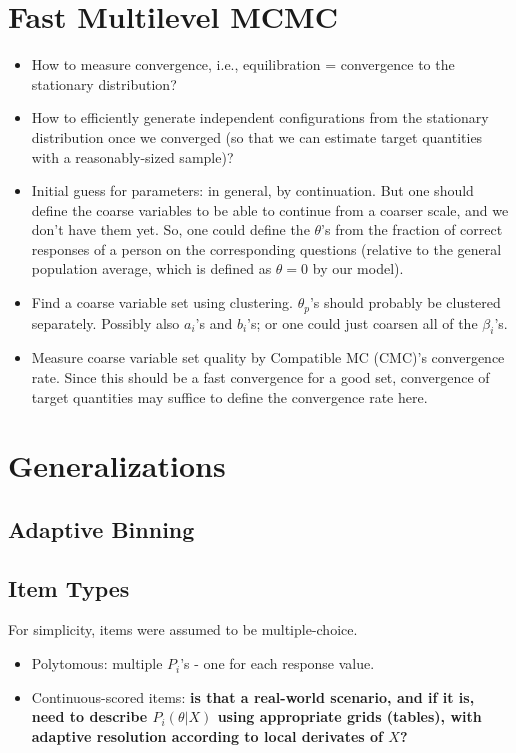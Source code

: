\documentclass{article}
\newcommand{\ta}{\theta}
\begin{document}
\section{Fast Multilevel MCMC}
\begin{itemize}
	\item How to measure convergence, i.e., equilibration = convergence to the stationary distribution? 
	\item How to efficiently generate independent configurations from the stationary distribution once we converged
	(so that we can estimate target quantities with a reasonably-sized sample)?
	\item Initial guess for parameters: in general, by continuation. But one should define the coarse variables
	to be able to continue from a coarser scale, and we don't have them yet. So, one could define the $\ta$'s
	from the fraction of correct responses of a person on the corresponding questions (relative to the general
	population average, which is defined as $\ta=0$ by our model).
	\item Find a coarse variable set using clustering. $\ta_p$'s should probably be clustered separately. 	Possibly also $a_i$'s and $b_i$'s; or one could just coarsen all of the $\beta_i$'s.
	\item Measure coarse variable set quality by Compatible MC (CMC)'s convergence rate. Since this should be a fast convergence for a good set, convergence of target quantities may suffice to define the convergence rate here.
\end{itemize}

\section{Generalizations}
\label{general}

\subsection{Adaptive Binning}
\label{adaptive_grid}

\subsection{Item Types}
For simplicity, items were assumed to be multiple-choice.
\begin{itemize}
	\item Polytomous: multiple $P_i$'s - one for each response value.
	\item Continuous-scored items: {\bf is that a real-world scenario, and if it is, 
	need to describe $P_i(\theta|X)$ using appropriate grids (tables), with adaptive resolution
	according to local derivates of $X$?}
\end{itemize}
\end{document}
